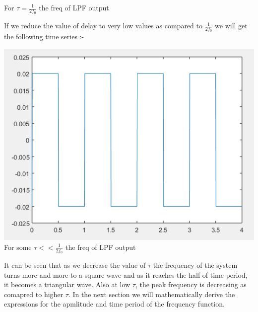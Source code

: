 \documentclass[12pt]{article}
\begin{document}
\begin{flushleft}
\begin{center}
    \caption{\label{fig:diff.PNG}{For $\tau =\frac{1}{2f_0} $ the freq of LPF output}}
\end{center}
If we reduce the value of delay to very low values as compared to $\frac{1}{2f_0}$ we will get the following time series  :- \\
\begin{center}
     \includegraphics[scale = 0.55]{diff0.PNG}\\[1.0 cm]
    \caption{\label{fig:diff.PNG}{For some $\tau << \frac{1}{2f_0}$ the freq of LPF output}}
\end{center}
It can be seen that as we decrease the value of $\tau$ the frequency of the system turns more and more to a square wave and as it reaches the half of time period, it becomes a triangular wave. Also at low $\tau$, the peak frequency is decreasing as comapred to higher $\tau$. In the next section we will mathematically derive the expressions for the apmlitude and time period of the frequency function.
\end{flushleft}
\end{document}
